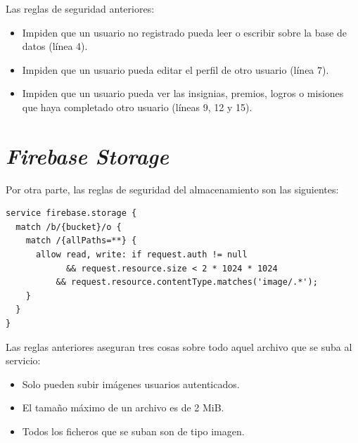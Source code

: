 \documentclass[twoside]{report}
\begin{document}
Las reglas de seguridad anteriores:
\begin{itemize}
\item Impiden que un usuario no registrado pueda leer o escribir sobre la base de datos (línea 4).
\item Impiden que un usuario pueda editar el perfil de otro usuario (línea 7).
\item Impiden que un usuario pueda ver las insignias, premios, logros o misiones que haya completado otro usuario (líneas 9, 12 y 15).
\end{itemize}

\clearpage

\section*{\textit{Firebase Storage}}

Por otra parte, las reglas de seguridad del almacenamiento son las siguientes:

\begin{lstlisting}
service firebase.storage {
  match /b/{bucket}/o {
    match /{allPaths=**} {
      allow read, write: if request.auth != null 
      		&& request.resource.size < 2 * 1024 * 1024
          && request.resource.contentType.matches('image/.*');
    }
  }
}
\end{lstlisting}

Las reglas anteriores aseguran tres cosas sobre todo aquel archivo que se suba al servicio:
\begin{itemize}
\item Solo pueden subir imágenes usuarios autenticados.
\item El tamaño máximo de un archivo es de 2 MiB.
\item Todos los ficheros que se suban son de tipo imagen.
\end{itemize}
\end{document}
